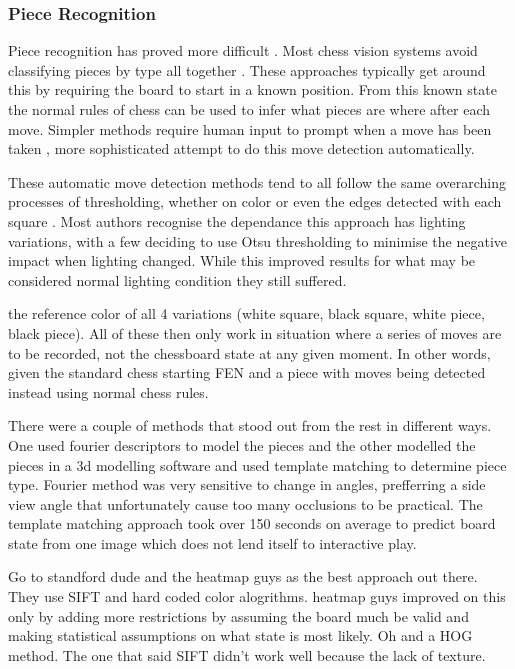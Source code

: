 \subsubsection{Piece Recognition}

Piece recognition has proved more difficult \cite{}.  Most chess vision systems avoid classifying pieces by 
type all together \cite{}.  These approaches typically get around this by requiring the board to start in a known position.
From this known state the normal rules of chess can be used to infer what pieces are where after each move.  Simpler methods
require human input to prompt when a move has been taken \cite{}, more sophisticated attempt to do this move detection automatically.

These automatic move detection methods tend to all follow the same overarching processes of thresholding, whether on color \cite{} or
even the edges detected with each square \cite{}.  Most authors recognise the dependance this approach has lighting variations, with a few 
deciding to use Otsu thresholding \cite{} to minimise the negative impact when lighting changed.  While this improved results for what may
be considered normal lighting condition they still suffered.

the reference color of all 4 variations (white square, black square, white piece, black piece).  
All of these then only work in situation where a series of moves are to be recorded, not the chessboard state at any given moment.
In other words,
given the standard chess starting FEN and a piece  with moves being detected instead using normal 
chess rules.  

There were a couple of methods that stood out from the rest in different ways.  One used fourier descriptors to model the pieces and the 
other modelled the pieces in a 3d modelling software and used template matching to determine piece type.  Fourier method was very sensitive 
to change in angles, prefferring a side view angle that unfortunately cause too many occlusions to be practical.  The template matching approach
took over 150 seconds on average to predict board state from one image which does not lend itself to interactive play.

Go to standford dude and the heatmap guys 
as the best approach out there. They use SIFT and hard coded color alogrithms.  heatmap guys improved on this 
only by adding more restrictions by assuming the board much be valid and making statistical assumptions on 
what state is most likely.  Oh and a HOG method.  The one that said SIFT didn't work well because the lack of texture.

